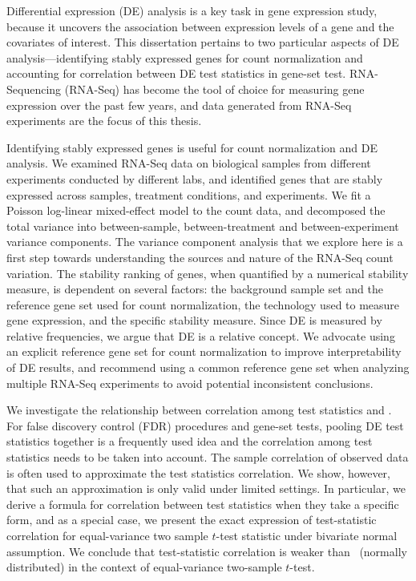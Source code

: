 
Differential expression (DE) analysis is a key task in gene expression study, because it uncovers 
the association between expression levels of a gene and the covariates of interest.
This dissertation pertains to two particular aspects of DE analysis---identifying stably expressed 
genes for count normalization and accounting for correlation between DE test statistics in gene-set 
test. RNA-Sequencing (RNA-Seq) has become the tool of choice for measuring gene expression over the 
past few years, and data generated from RNA-Seq experiments are the focus of this thesis. 

Identifying stably expressed genes is useful for count normalization and DE analysis. We examined 
RNA-Seq data on \howmanySamples biological samples from \howmanylab different experiments conducted 
by different labs, and identified genes that are stably expressed across samples, treatment 
conditions, and experiments. We fit a Poisson log-linear mixed-effect model to the count data, and 
decomposed the total variance into between-sample, between-treatment and between-experiment 
variance components. The variance 
component analysis that we explore here is a first step towards understanding the sources and 
nature of the RNA-Seq count variation. The stability ranking of genes, when quantified by a 
numerical stability measure, is dependent on several factors: the background sample set and the 
reference gene set used for count normalization, the 
technology used to measure gene expression, and the specific stability measure. Since DE is 
measured by relative frequencies, we argue that DE is a relative concept. We advocate using an 
explicit reference gene set for count normalization to improve interpretability of DE results, and 
recommend using a common reference gene set when analyzing multiple RNA-Seq experiments to avoid 
potential inconsistent conclusions.


We investigate the relationship between correlation among test statistics and \popucor. For false 
discovery control (FDR) procedures and gene-set tests, pooling DE test 
statistics together is a frequently used idea and the correlation among test statistics needs to be 
taken into account. The sample correlation of observed data is often used to approximate the 
test statistics correlation. We show, however, that such an approximation is only valid under 
limited settings. In particular, we derive a formula for correlation between test statistics when 
they take a specific form, and as a special case, we present the exact expression of test-statistic 
correlation for equal-variance two sample $t$-test statistic under bivariate 
normal assumption. We conclude that test-statistic correlation is weaker than \popucor~(normally 
distributed) in the context of 
equal-variance two-sample $t$-test.

